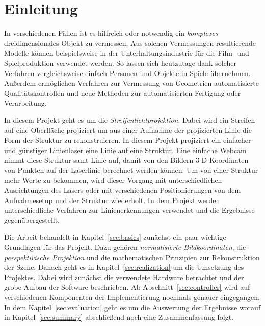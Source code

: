 \documentclass[ngerman,a4paper,parskip=half]{scrartcl}
\begin{document}


\tableofcontents
\newpage


\section{Einleitung}
\label{sec:introduction}

In verschiedenen Fällen ist es hilfreich oder notwendig ein \emph{komplexes} dreidimensionales Objekt zu vermessen. Aus solchen Vermessungen resultierende Modelle können beispielsweise in der Unterhaltungsindustrie für die Film- und Spielproduktion verwendet werden. So lassen sich heutzutage dank solcher Verfahren vergleichsweise einfach Personen und Objekte in Spiele übernehmen. Außerdem ermöglichen Verfahren zur Vermessung von Geometrien automatisierte Qualitätskontrollen und neue Methoden zur automatisierten Fertigung oder Verarbeitung.

In diesem Projekt geht es um die \emph{Streifenlichtprojektion}. Dabei wird ein Streifen auf eine Oberfläche projiziert um aus einer Aufnahme der projizierten Linie die Form der Struktur zu rekonstruieren. In diesem Projekt projiziert ein einfacher und günstiger Linienlaser eine Linie auf eine Struktur. Eine einfache Webcam nimmt diese Struktur samt Linie auf, damit von den Bildern 3-D-Koordinaten von Punkten auf der Laserlinie berechnet werden können. Um von einer Struktur mehr Werte zu bekommen, wird dieser Vorgang mit unterschiedlichen Ausrichtungen des Lasers oder mit verschiedenen Positionierungen von dem Aufnahmesetup und der Struktur wiederholt. In dem Projekt werden unterschiedliche Verfahren zur Linienerkennungen verwendet und die Ergebnisse gegenübergestellt.

Die Arbeit behandelt in Kapitel~\ref{sec:basics} zunächst ein paar wichtige Grundlagen für das Projekt. Dazu gehören \emph{normalisierte Bildkoordinaten}, die \emph{perspektivische Projektion} und die mathematischen Prinzipien zur Rekonstruktion der Szene. Danach geht es in Kapitel~\ref{sec:realization} um die Umsetzung des Projektes. Dabei wird zunächst die verwendete Hardware betrachtet und der grobe Aufbau der Software beschrieben. Ab Abschnitt~\ref{sec:controller} wird auf verschiedenen Komponenten der Implementierung nochmals genauer eingegangen. In dem Kapitel~\ref{sec:evaluation} geht es um die Auswertung der Ergebnisse worauf in Kapitel~\ref{sec:summary} abschließend noch eine Zusammenfassung folgt.
\end{document}
